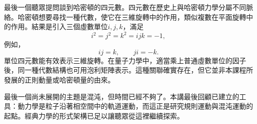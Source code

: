最後一個聽眾提問談到哈密頓的四元數。四元數在歷史上與哈密頓力學分屬不同脈絡。哈密頓想要尋找一種代數，使它在三維旋轉中的作用，類似複數在平面旋轉中的作用。結果是引入三個虛數單位\(i,j,k\)，滿足
\begin{equation}
  i^2=j^2=k^2=ijk=-1,
\end{equation}
例如，
\begin{equation}
  ij=k,
  \qquad
  ji=-k.
\end{equation}
單位四元數能有效表示三維旋轉。在量子力學中，適當乘上普通虛數單位的因子後，同一種代數結構也可用泡利矩陣表示。這種關聯確實存在，但它並非本課程所發展的正則動量或哈密頓量的由來。

最後一個尚未展開的主題是混沌，但時間已經不夠了。本講最後回顧已建立的工具：動力學是粒子沿著相空間中的軌道運動，而這正是研究規則運動與混沌運動的起點。經典力學的形式架構已足以讓聽眾從這裡繼續探索。
